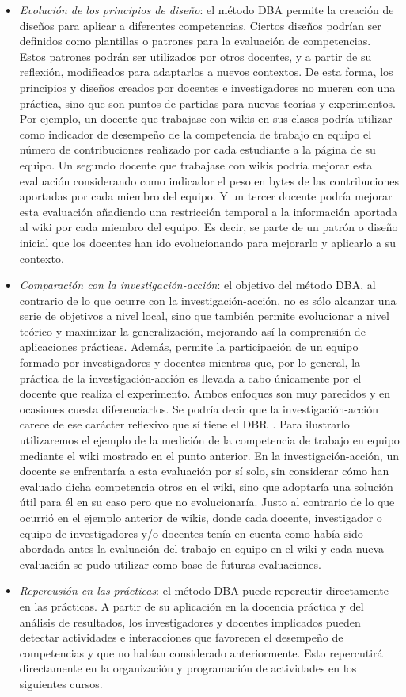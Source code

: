 \begin{itemize}
\item \emph{Evolución de los principios de diseño}: el método DBA permite la creación de diseños para aplicar a diferentes competencias. Ciertos diseños podrían ser definidos como plantillas o patrones para la evaluación de competencias. Estos patrones podrán ser utilizados por otros docentes, y a partir de su reflexión, modificados para  adaptarlos a nuevos contextos. De esta forma, los principios y diseños creados por docentes e investigadores no mueren con una práctica, sino que son puntos de partidas para nuevas teorías y experimentos. Por ejemplo, un docente que trabajase con wikis en sus clases podría utilizar como indicador de desempeño de la competencia de trabajo en equipo el número de contribuciones realizado por cada estudiante a la página de su equipo. Un segundo docente que trabajase con wikis podría mejorar esta evaluación considerando como indicador el peso en bytes de las contribuciones aportadas por cada miembro del equipo. Y un tercer docente podría mejorar esta evaluación añadiendo una restricción temporal a la información aportada al wiki por cada miembro del equipo. Es decir, se parte de un patrón o diseño inicial que los docentes han ido evolucionando para mejorarlo y aplicarlo a su contexto.
\item \emph{Comparación con la investigación-acción}: el objetivo del método DBA, al contrario de lo que ocurre con la investigación-acción, no es sólo alcanzar una serie de objetivos a nivel local, sino que también permite evolucionar a nivel teórico y maximizar la generalización, mejorando así la comprensión de aplicaciones prácticas. Además, permite la participación de un equipo formado por investigadores y docentes mientras que, por lo general, la práctica de la investigación-acción es llevada a cabo únicamente por el docente que realiza el experimento. Ambos enfoques son muy parecidos y en ocasiones cuesta diferenciarlos. Se podría decir que la investigación-acción carece de ese carácter reflexivo que sí tiene el DBR~\cite{cole2005being}. Para ilustrarlo utilizaremos el ejemplo de la medición de la competencia de trabajo en equipo mediante el wiki mostrado en el punto anterior. En la investigación-acción, un docente se enfrentaría a esta evaluación por sí solo, sin considerar cómo han evaluado dicha competencia otros en el wiki, sino que adoptaría una solución útil para él en su caso pero que no evolucionaría. Justo al contrario de lo que ocurrió en el ejemplo anterior de wikis, donde cada docente, investigador o equipo de investigadores y/o docentes tenía en cuenta como había sido abordada antes la evaluación del trabajo en equipo en el wiki y cada nueva evaluación se pudo utilizar como base de futuras evaluaciones.
\item \emph{Repercusión en las prácticas}: el método DBA puede repercutir directamente en las prácticas. A partir de su aplicación en la docencia práctica y del análisis de resultados, los investigadores y docentes implicados pueden detectar actividades e interacciones que favorecen el desempeño de competencias y que no habían considerado anteriormente. Esto repercutirá directamente en la organización y programación de actividades en los siguientes cursos.
\end{itemize}

